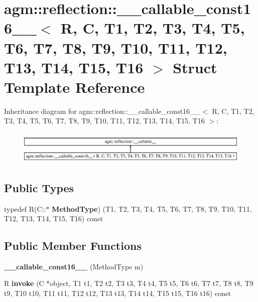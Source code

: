 \hypertarget{structagm_1_1reflection_1_1____callable__const16____}{}\section{agm\+:\+:reflection\+:\+:\+\_\+\+\_\+callable\+\_\+const16\+\_\+\+\_\+$<$ R, C, T1, T2, T3, T4, T5, T6, T7, T8, T9, T10, T11, T12, T13, T14, T15, T16 $>$ Struct Template Reference}
\label{structagm_1_1reflection_1_1____callable__const16____}
Inheritance diagram for agm\+:\+:reflection\+:\+:\+\_\+\+\_\+callable\+\_\+const16\+\_\+\+\_\+$<$ R, C, T1, T2, T3, T4, T5, T6, T7, T8, T9, T10, T11, T12, T13, T14, T15, T16 $>$\+:\begin{figure}[H]
\begin{center}
\leavevmode
\includegraphics[height=1.604584cm]{structagm_1_1reflection_1_1____callable__const16____}
\end{center}
\end{figure}
\subsection*{Public Types}
\begin{DoxyCompactItemize}
\item 
typedef R(C\+::$\ast$ {\bfseries Method\+Type}) (T1, T2, T3, T4, T5, T6, T7, T8, T9, T10, T11, T12, T13, T14, T15, T16) const \hypertarget{structagm_1_1reflection_1_1____callable__const16_____af827c114732de41931fffd3e959b525f}{}\label{structagm_1_1reflection_1_1____callable__const16_____af827c114732de41931fffd3e959b525f}

\end{DoxyCompactItemize}
\subsection*{Public Member Functions}
\begin{DoxyCompactItemize}
\item 
{\bfseries \+\_\+\+\_\+callable\+\_\+const16\+\_\+\+\_\+} (Method\+Type m)\hypertarget{structagm_1_1reflection_1_1____callable__const16_____adb544a48e4067207fea6d46eb6d13861}{}\label{structagm_1_1reflection_1_1____callable__const16_____adb544a48e4067207fea6d46eb6d13861}

\item 
R {\bfseries invoke} (C $\ast$object, T1 t1, T2 t2, T3 t3, T4 t4, T5 t5, T6 t6, T7 t7, T8 t8, T9 t9, T10 t10, T11 t11, T12 t12, T13 t13, T14 t14, T15 t15, T16 t16) const \hypertarget{structagm_1_1reflection_1_1____callable__const16_____a6bc7be378d3f645237f4c140cb600ec7}{}\label{structagm_1_1reflection_1_1____callable__const16_____a6bc7be378d3f645237f4c140cb600ec7}

\end{DoxyCompactItemize}
